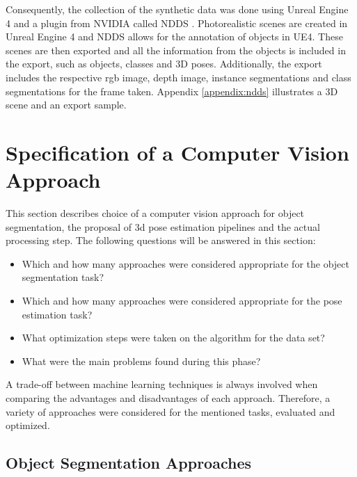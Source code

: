 Consequently, the collection of the synthetic data was done using Unreal Engine 4 and a plugin from NVIDIA \cite{2021ue4} called NDDS \cite{2021ndds}. Photorealistic scenes are created in Unreal Engine 4 and NDDS allows for the annotation of objects in UE4. These scenes are then exported and all the information from the objects is included in the export, such as objects, classes and 3D poses. Additionally, the export includes the respective rgb image, depth image, instance segmentations and class segmentations for the frame taken. Appendix \ref{appendix:ndds} illustrates a 3D scene and an export sample.

\section{Specification of a Computer Vision Approach}\label{chap:3:method}

This section describes choice of a computer vision approach for object segmentation, the proposal of 3d pose estimation pipelines and the actual processing step. The following questions will be answered in this section:
\begin{itemize}
    \item Which and how many approaches were considered appropriate for the object segmentation task?
    \item Which and how many approaches were considered appropriate for the pose estimation task?
    \item What optimization steps were taken on the algorithm for the data set?
    \item What were the main problems found during this phase?
\end{itemize}
A trade-off between machine learning techniques is always involved when comparing the advantages and disadvantages of each approach. Therefore, a variety of approaches were considered for the mentioned tasks, evaluated and optimized.

\subsection{Object Segmentation Approaches}

